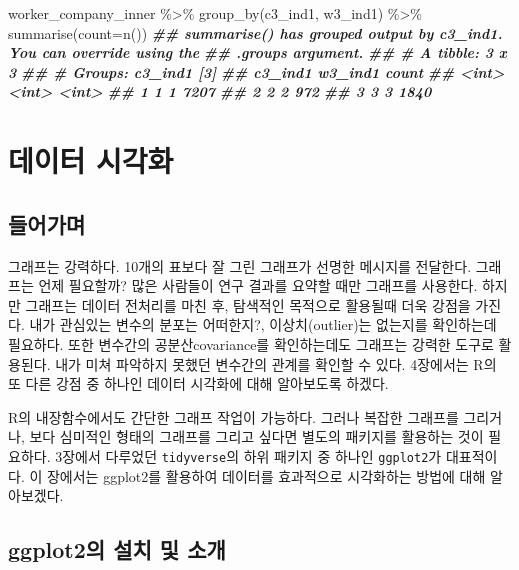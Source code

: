 \documentclass[
]{book}
\newenvironment{Shaded}{\begin{snugshade}}{\end{snugshade}}
\newcommand{\AttributeTok}[1]{\textcolor[rgb]{0.77,0.63,0.00}{#1}}
\newcommand{\DocumentationTok}[1]{\textcolor[rgb]{0.56,0.35,0.01}{\textbf{\textit{#1}}}}
\newcommand{\FunctionTok}[1]{\textcolor[rgb]{0.00,0.00,0.00}{#1}}
\newcommand{\NormalTok}[1]{#1}
\newcommand{\SpecialCharTok}[1]{\textcolor[rgb]{0.00,0.00,0.00}{#1}}
\theoremstyle{definition}
\theoremstyle{definition}
\theoremstyle{definition}
\theoremstyle{definition}
\theoremstyle{remark}
\begin{document}
\begin{Shaded}
\begin{Highlighting}[]
\NormalTok{worker\_company\_inner }\SpecialCharTok{\%\textgreater{}\%} 
  \FunctionTok{group\_by}\NormalTok{(c3\_ind1, w3\_ind1) }\SpecialCharTok{\%\textgreater{}\%} 
  \FunctionTok{summarise}\NormalTok{(}\AttributeTok{count=}\FunctionTok{n}\NormalTok{())}
\DocumentationTok{\#\# \textasciigrave{}summarise()\textasciigrave{} has grouped output by \textquotesingle{}c3\_ind1\textquotesingle{}. You can override using the}
\DocumentationTok{\#\# \textasciigrave{}.groups\textasciigrave{} argument.}
\DocumentationTok{\#\# \# A tibble: 3 x 3}
\DocumentationTok{\#\# \# Groups:   c3\_ind1 [3]}
\DocumentationTok{\#\#   c3\_ind1 w3\_ind1 count}
\DocumentationTok{\#\#     \textless{}int\textgreater{}   \textless{}int\textgreater{} \textless{}int\textgreater{}}
\DocumentationTok{\#\# 1       1       1  7207}
\DocumentationTok{\#\# 2       2       2   972}
\DocumentationTok{\#\# 3       3       3  1840}
\end{Highlighting}
\end{Shaded}

\hypertarget{graph}{%
\chapter{데이터 시각화}\label{graph}}

\hypertarget{uxb4e4uxc5b4uxac00uxba70-1}{%
\section{들어가며}\label{uxb4e4uxc5b4uxac00uxba70-1}}

그래프는 강력하다. 10개의 표보다 잘 그린 그래프가 선명한 메시지를 전달한다. 그래프는 언제 필요할까? 많은 사람들이 연구 결과를 요약할 때만 그래프를 사용한다. 하지만 그래프는 데이터 전처리를 마친 후, 탐색적인 목적으로 활용될때 더욱 강점을 가진다. 내가 관심있는 변수의 분포는 어떠한지?, 이상치(outlier)는 없는지를 확인하는데 필요하다. 또한 변수간의 공분산covariance를 확인하는데도 그래프는 강력한 도구로 활용된다. 내가 미쳐 파악하지 못했던 변수간의 관계를 확인할 수 있다. 4장에서는 R의 또 다른 강점 중 하나인 데이터 시각화에 대해 알아보도록 하겠다.

R의 내장함수에서도 간단한 그래프 작업이 가능하다. 그러나 복잡한 그래프를 그리거나, 보다 심미적인 형태의 그래프를 그리고 싶다면 별도의 패키지를 활용하는 것이 필요하다. 3장에서 다루었던 \texttt{tidyverse}의 하위 패키지 중 하나인 \texttt{ggplot2}가 대표적이다. 이 장에서는 ggplot2를 활용하여 데이터를 효과적으로 시각화하는 방법에 대해 알아보겠다.

\hypertarget{ggplot2uxc758-uxc124uxce58-uxbc0f-uxc18cuxac1c}{%
\section{ggplot2의 설치 및 소개}\label{ggplot2uxc758-uxc124uxce58-uxbc0f-uxc18cuxac1c}}
\end{document}
